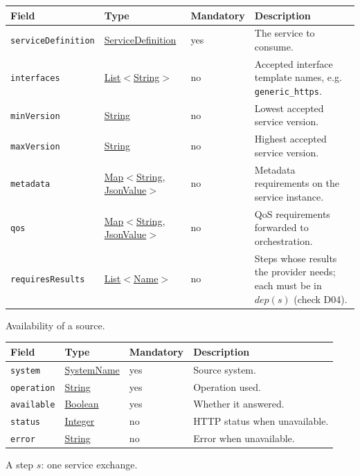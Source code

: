 \documentclass[a4paper]{arrowhead}
\newcommand{\pref}[1]{{\textcolor{ArrowheadGrey}{\hyperref[sec:model:primitives:#1]{#1}}}}
\begin{document}
{\small
\begin{longtable}{|p{3.7cm}|p{4.2cm}|p{1.6cm}|p{6.3cm}|}

\hline
\rowcolor{gray!33} Field & Type & Mandatory & Description \\ \hline
\endhead
\texttt{serviceDefinition} & \pref{ServiceDefinition} & yes & The service to consume. \\ \hline
\texttt{interfaces} & \pref{List}$<$\pref{String}$>$ & no & Accepted interface template names, e.g. \texttt{generic\_https}. \\ \hline
\texttt{minVersion} & \pref{String} & no & Lowest accepted service version. \\ \hline
\texttt{maxVersion} & \pref{String} & no & Highest accepted service version. \\ \hline
\texttt{metadata} & \pref{Map}$<$\pref{String}, \pref{JsonValue}$>$ & no & Metadata requirements on the service instance. \\ \hline
\texttt{qos} & \pref{Map}$<$\pref{String}, \pref{JsonValue}$>$ & no & QoS requirements forwarded to orchestration. \\ \hline
\texttt{requiresResults} & \pref{List}$<$\pref{Name}$>$ & no & Steps whose results the provider needs; each must be in $dep(s)$ (check D04). \\ \hline
\end{longtable}
}

Availability of a source.

{\small
\begin{longtable}{|p{3.7cm}|p{4.2cm}|p{1.6cm}|p{6.3cm}|}

\hline
\rowcolor{gray!33} Field & Type & Mandatory & Description \\ \hline
\endhead
\texttt{system} & \pref{SystemName} & yes & Source system. \\ \hline
\texttt{operation} & \pref{String} & yes & Operation used. \\ \hline
\texttt{available} & \pref{Boolean} & yes & Whether it answered. \\ \hline
\texttt{status} & \pref{Integer} & no & HTTP status when unavailable. \\ \hline
\texttt{error} & \pref{String} & no & Error when unavailable. \\ \hline
\end{longtable}
}

A step $s$: one service exchange.
\end{document}
